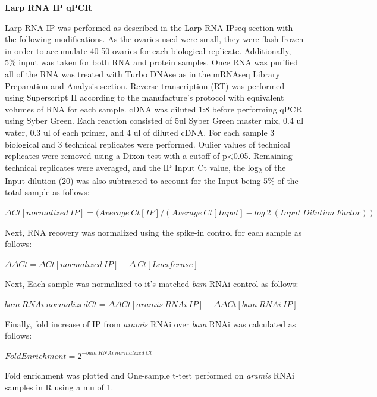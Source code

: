 \documentclass[12pt,oneside]{reedthesis}
\begin{document}
\textbf{Larp RNA IP qPCR}

Larp RNA IP was performed as described in the Larp RNA IPseq section
with the following modifications. As the ovaries used were small, they
were flash frozen in order to accumulate 40-50 ovaries for each
biological replicate. Additionally, 5\% input was taken for both RNA and
protein samples. Once RNA was purified all of the RNA was treated with
Turbo DNAse as in the {} mRNAseq Library Preparation and
Analysis section. Reverse transcription (RT) was performed using
Superscript II according to the manufacture's protocol with equivalent
volumes of RNA for each sample. cDNA was diluted 1:8 before performing
qPCR using Syber Green. Each reaction consisted of 5ul Syber Green
master mix, 0.4 ul water, 0.3 ul of each primer, and 4 ul of diluted
cDNA. For each sample 3 biological and 3 technical replicates were
performed. Oulier values of technical replicates were removed using a
Dixon test with a cutoff of p\textless0.05. Remaining technical replicates were
averaged, and the IP Input Ct value, the log\textsubscript{2} of the Input dilution
(20) was also subtracted to account for the Input being 5\% of the total
sample as follows:

\textbf{\hfill\break
}

\(\Delta Ct[normalized\ IP] = (Average\ Ct[IP]/(Average\ Ct[Input] - log~2~(Input\ Dilution\ Factor))\)

\textbf{\hfill\break
}

Next, RNA recovery was normalized using the spike-in control for each
sample as follows:

\textbf{\hfill\break
}

\(\Delta \Delta Ct = \Delta Ct[normalized\ IP]-\Delta\ Ct[Luciferase]\)

\textbf{\hfill\break
}

Next, Each sample was normalized to it's matched \emph{bam} RNAi control as
follows:

\textbf{\hfill\break
}

\(bam\ RNAi\ normalized Ct= \Delta \Delta Ct[aramis\ RNAi\ IP] - \Delta \Delta Ct[bam\ RNAi\ IP]\)

Finally, fold increase of IP from \emph{aramis} RNAi over \emph{bam} RNAi was
calculated as follows:

\textbf{\hfill\break
}

\(Fold Enrichment = 2^{-bam\ RNAi\ normalized\ Ct}\)

\textbf{\hfill\break
}

Fold enrichment was plotted and One-sample t-test performed on \emph{aramis}
RNAi samples in R using a mu of 1.
\end{document}
